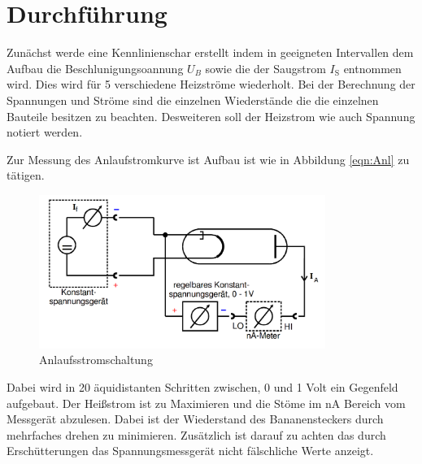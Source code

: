 \section{Durchführung}
\label{sec:Durchführung}
Zunächst werde eine Kennlinienschar erstellt indem in geeigneten Intervallen dem Aufbau die Beschlunigungsoannung $U_B$ sowie die der Saugstrom $I_\text{S}$ entnommen wird. Dies wird für 5 verschiedene Heizströme wiederholt. Bei der Berechnung der Spannungen und Ströme sind die einzelnen Wiederstände die die einzelnen Bauteile besitzen zu beachten. Desweiteren soll der Heizstrom wie auch Spannung notiert werden.

Zur Messung des Anlaufstromkurve ist Aufbau ist wie in Abbildung \ref{eqn:Anl} zu tätigen. 
\begin{figure}
  \centering
  \includegraphics[height=5cm]{picture/Gegenfeld.png}
  \caption{Anlaufsstromschaltung \cite{pra}}
  \label{fig:Anl}
\end{figure}
Dabei wird in 20 äquidistanten Schritten zwischen, 0 und 1 Volt ein Gegenfeld aufgebaut. Der Heißstrom ist zu Maximieren und die Stöme im nA Bereich vom Messgerät abzulesen. Dabei ist der Wiederstand des Bananensteckers durch mehrfaches drehen zu minimieren. Zusätzlich ist darauf zu achten das durch Erschütterungen das Spannungsmessgerät nicht fälschliche Werte anzeigt. 
